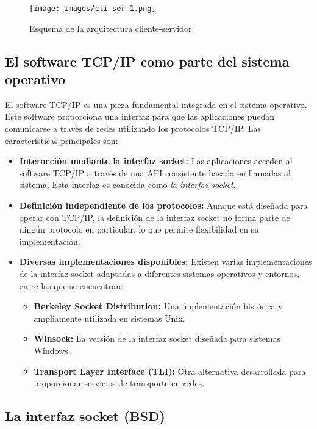 \documentclass[a4paper,12pt]{article}
\begin{document}
\begin{figure}[H]
    \centering
    \texttt{[image: images/cli-ser-1.png]}
    \caption{Esquema de la arquitectura cliente-servidor.}
    \label{fig:cliente-servidor}
\end{figure}

\subsection{El software TCP/IP como parte del sistema operativo}

El software TCP/IP es una pieza fundamental integrada en el sistema operativo. Este software proporciona una interfaz para que las aplicaciones puedan comunicarse a través de redes utilizando los protocolos TCP/IP. Las características principales son:

\begin{itemize}
    \item \textbf{Interacción mediante la interfaz socket:} Las aplicaciones acceden al software TCP/IP a través de una API consistente basada en llamadas al sistema. Esta interfaz es conocida como \emph{la interfaz socket}.
    \item \textbf{Definición independiente de los protocolos:} Aunque está diseñada para operar con TCP/IP, la definición de la interfaz socket no forma parte de ningún protocolo en particular, lo que permite flexibilidad en su implementación.
    \item \textbf{Diversas implementaciones disponibles:} Existen varias implementaciones de la interfaz socket adaptadas a diferentes sistemas operativos y entornos, entre las que se encuentran:
    \begin{itemize}
        \item \textbf{Berkeley Socket Distribution:} Una implementación histórica y ampliamente utilizada en sistemas Unix.
        \item \textbf{Winsock:} La versión de la interfaz socket diseñada para sistemas Windows.
        \item \textbf{Transport Layer Interface (TLI):} Otra alternativa desarrollada para proporcionar servicios de transporte en redes.
    \end{itemize}
\end{itemize}

\subsection{La interfaz socket (BSD)}
\end{document}
